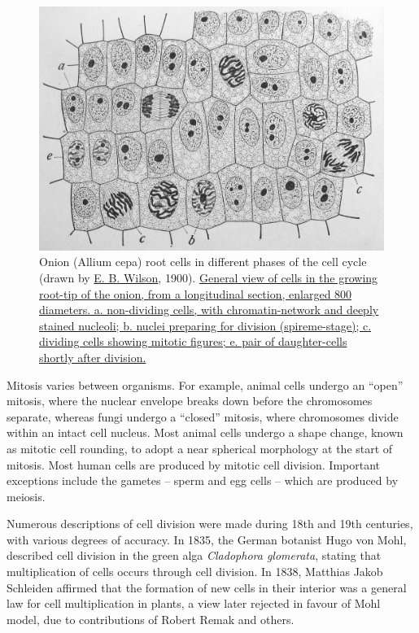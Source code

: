 \begin{figure}

{\centering \includegraphics[width=0.7\linewidth]{./figures/reproduction/Wilson1900Fig2} 

}

\caption{Onion (Allium cepa) root cells in different phases of the cell cycle (drawn by \href{https://en.wikipedia.org/wiki/Edmund_Beecher_Wilson}{E. B. Wilson}, 1900). \href{https://commons.wikimedia.org/wiki/File:Wilson1900Fig2.jpg}{General view of cells in the growing root-tip of the onion, from a longitudinal section, enlarged 800 diameters. a. non-dividing cells, with chromatin-network and deeply stained nucleoli; b. nuclei preparing for division (spireme-stage); c. dividing cells showing mitotic figures; e. pair of daughter-cells shortly after division.}}\label{fig:onionroot}
\end{figure}

Mitosis varies between organisms. For example, animal cells undergo an ``open'' mitosis, where the nuclear envelope breaks down before the chromosomes separate, whereas fungi undergo a ``closed'' mitosis, where chromosomes divide within an intact cell nucleus. Most animal cells undergo a shape change, known as mitotic cell rounding, to adopt a near spherical morphology at the start of mitosis. Most human cells are produced by mitotic cell division. Important exceptions include the gametes -- sperm and egg cells -- which are produced by meiosis.

Numerous descriptions of cell division were made during 18th and 19th centuries, with various degrees of accuracy. In 1835, the German botanist Hugo von Mohl, described cell division in the green alga \emph{Cladophora glomerata}, stating that multiplication of cells occurs through cell division. In 1838, Matthias Jakob Schleiden affirmed that the formation of new cells in their interior was a general law for cell multiplication in plants, a view later rejected in favour of Mohl model, due to contributions of Robert Remak and others.

